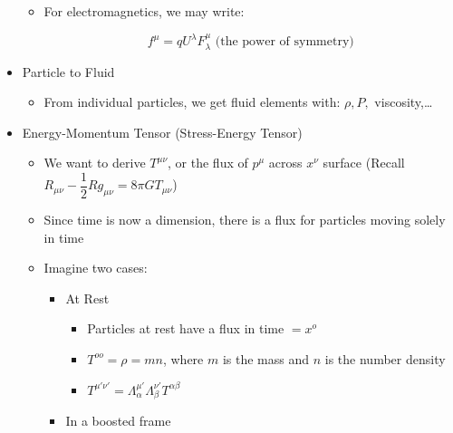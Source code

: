 \begin{itemize}
\begin{itemize}
      \item For electromagnetics, we may write:

        $$f^{\mu}=qU^{\lambda}F_{\lambda}^{\mu}\text{ (the power of symmetry)}$$

    \end{itemize}

  \item Particle to Fluid

    \begin{itemize}

      \item From individual particles, we get fluid elements with: $\rho, P,$ viscosity,\ldots

    \end{itemize}

  \item Energy-Momentum Tensor (Stress-Energy Tensor)

    \begin{itemize}

      \item We want to derive $T^{\mu\nu}$, or the flux of $p^{\mu}$ across $x^{\nu}$ surface (Recall $R_{\mu\nu}-\dfrac{1}{2}Rg_{\mu\nu}=8\pi GT_{\mu\nu}$)

      \item Since time is now a dimension, there is a flux for particles moving solely in time

      \item Imagine two cases:

        \begin{itemize}

          \item At Rest

            \begin{itemize}

              \item Particles at rest have a flux in time $=x^o$

              \item $T^{oo}=\rho=mn$, where $m$ is the mass and $n$ is the number density

              \item $T^{\mu'\nu'}=\Lambda^{\mu'}_{\alpha}\Lambda^{\nu'}_{\beta}T^{\alpha\beta}$

            \end{itemize}

          \item In a boosted frame


\end{itemize}
\end{itemize}
\end{itemize}
